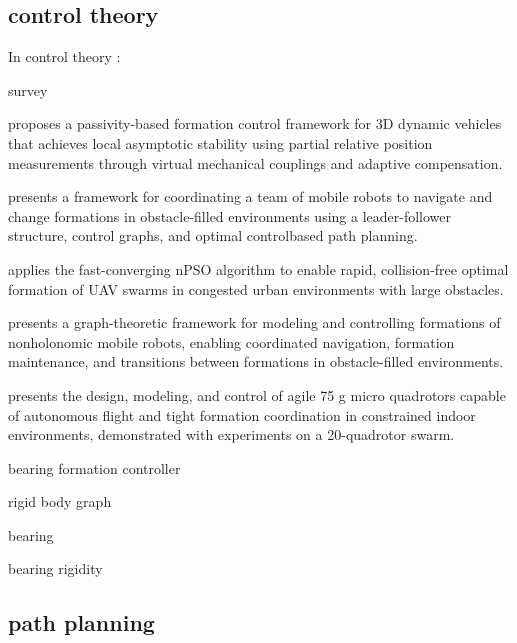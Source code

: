 \subsection{control theory}

In control theory :

\cite{oh2015survey} survey

\cite{stacey2015passivity} proposes a passivity-based formation control framework for 3D dynamic vehicles that achieves local asymptotic stability using partial relative position measurements through virtual mechanical couplings and adaptive compensation.

\cite{desai1999control} presents a framework for coordinating a team of mobile robots to navigate and change formations in obstacle-filled environments using a leader-follower structure, control graphs, and optimal control\-based path planning.

\cite{spanogianopoulos2017fast} applies the fast-converging nPSO algorithm to enable rapid, collision-free optimal formation of UAV swarms in congested urban environments with large obstacles.

\cite{desai2002modeling} presents a graph-theoretic framework for modeling and controlling formations of nonholonomic mobile robots, enabling coordinated navigation, formation maintenance, and transitions between formations in obstacle-filled environments.

\cite{kushleyev2013towards} presents the design, modeling, and control of agile 75 g micro quadrotors capable of autonomous flight and tight formation coordination in constrained indoor environments, demonstrated with experiments on a 20-quadrotor swarm.


\cite{schiano2016rigidity} bearing formation controller

rigid body graph
\cite{yang2018growing}
\cite{mehdifar2018finite}

bearing
\cite{zhao2015translational}
\cite{zhao2015bearing}
\cite{li2020adaptive}
\cite{li2021adaptive}
\cite{li2020bearing}
\cite{zhao2021finite}
\cite{zhang2022distributed}
\cite{zhang2023bearing}
\cite{arrigoni2018bearing}
\cite{zhao2019bearing}
\cite{trinh2018bearing}
\cite{trinh2021finite}

bearing rigidity
\cite{tay1985generating}
\cite{eren2012formation}
\cite{trinh2019minimal}
\cite{karimian2017theory}
\cite{hou2016elementary}
\cite{carboni2014rigidity}


\subsection{path planning}

